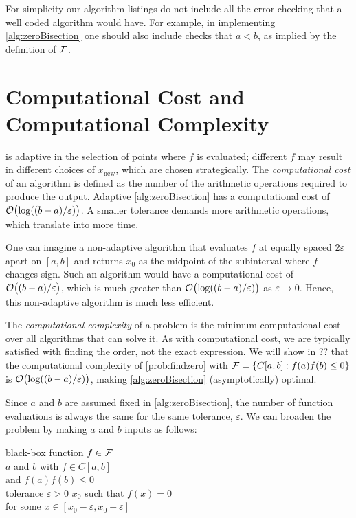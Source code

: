 For simplicity our algorithm listings do not include all the error-checking that a well coded algorithm would have.  For example, in implementing \cref{alg:zeroBisection} one should also include checks that $a< b$, as implied by the definition of $\mathcal{F}$.

\section{Computational Cost and Computational Complexity}

 is adaptive in the selection of points where $f$ is evaluated; different $f$ may result in different choices of $x_{\text{new}}$, which are chosen strategically. The \emph{computational cost} of an algorithm is defined as the number of the arithmetic operations required to produce the output.  Adaptive \cref{alg:zeroBisection} has a computational cost of $\operatorname{{\mathcal O}}\bigl(\log((b-a)/\varepsilon)\bigr)$.  A smaller tolerance demands more arithmetic operations, which translate into more time.

One can imagine a non-adaptive algorithm that evaluates $f$ at  equally spaced $2\varepsilon$ apart on $[a,b]$ and returns $x_0$ as the midpoint of the subinterval where $f$ changes sign.  Such an algorithm would have a computational cost of $\operatorname{{\mathcal O}}\bigl((b-a)/\varepsilon\bigr)$, which is much greater than $\operatorname{{\mathcal O}}\bigl(\log((b-a)/\varepsilon)\bigr)$ as $\varepsilon \to 0$.  Hence, this non-adaptive algorithm is much less efficient.   

The \emph{computational complexity} of a problem is the minimum computational cost over all algorithms that can solve it.  As with computational cost, we are typically satisfied with finding the order, not the exact expression.  We will show in ?? that the computational complexity of \cref{prob:findzero} with $\mathcal{F} = \{C[a,b] : f(a)f(b) \le 0\}$ is $\operatorname{{\mathcal O}}\bigl(\log((b-a)/\varepsilon)\bigr)$, making \cref{alg:zeroBisection} (asymptotically) optimal.

Since $a$ and $b$ are assumed fixed in \cref{alg:zeroBisection}, the number of function evaluations is always the same for the same tolerance, $\varepsilon$.  We can broaden the problem by making $a$ and $b$ inputs as follows:

\begin{NumProblem}%
\label{prob:findzerocont}
%
{black-box function $f \in \mathcal{F}$ \\ 
$a$ and $b$ with $f \in C[a,b]$ \\
\qquad and $f(a) f(b) \le 0$ \\
tolerance $\varepsilon > 0$ }%
{$x_0$ such that $f(x) = 0$ \\ 
    \qquad for some $x \in [x_0 - \varepsilon, x_0 + \varepsilon]$}
\end{NumProblem}

